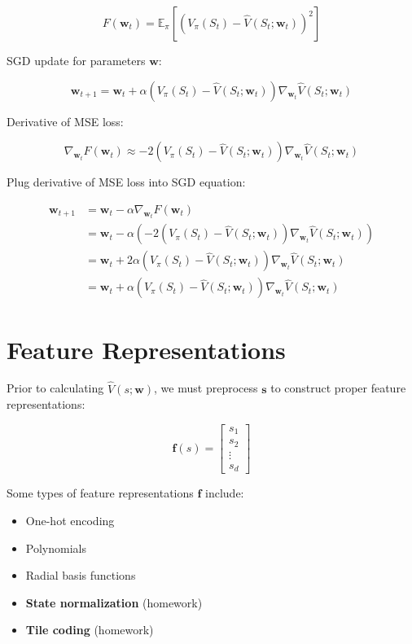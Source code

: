 \documentclass[
  letterpaper,
  DIV=11,
  numbers=noendperiod]{scrreprt}
\providecommand{\tightlist}{%
  \setlength{\itemsep}{0pt}\setlength{\parskip}{0pt}}\usepackage{longtable,booktabs,array}
\begin{document}
\[
F(\mathbf{w}_{t}) = \mathbb{E}_{\pi}[(V_{\pi}(S_{t}) - \hat{V}(S_{t}; \mathbf{w}_{t}))^{2}]
\]

SGD update for parameters \(\mathbf{w}\):

\[
\mathbf{w}_{t+1} = \mathbf{w}_{t} + \alpha(V_{\pi}(S_{t}) - \hat{V}(S_{t}; \mathbf{w}_{t}))\nabla_{\mathbf{w}_{t}} \hat{V}(S_{t}; \mathbf{w}_{t})
\]

Derivative of MSE loss:

\[
\nabla_{\mathbf{w}_{t}} F(\mathbf{w}_{t}) \approx -2(V_{\pi}(S_{t}) - \hat{V}(S_{t}; \mathbf{w}_{t}))\nabla_{\mathbf{w}_{t}} \hat{V}(S_{t}; \mathbf{w}_{t})
\]

Plug derivative of MSE loss into SGD equation:

\[
\begin{align}
\mathbf{w}_{t+1} &= \mathbf{w}_{t} - \alpha \nabla_{\mathbf{w}_{t}} F(\mathbf{w}_{t}) \\[10pt]
 &= \mathbf{w}_{t} - \alpha (-2(V_{\pi}(S_{t}) - \hat{V}(S_{t}; \mathbf{w}_{t}))\nabla_{\mathbf{w}_{t}} \hat{V}(S_{t}; \mathbf{w}_{t})) \\[10pt]
&= \mathbf{w}_{t} + 2\alpha(V_{\pi}(S_{t}) - \hat{V}(S_{t}; \mathbf{w}_{t}))\nabla_{\mathbf{w}_{t}} \hat{V}(S_{t}; \mathbf{w}_{t}) \\[10pt]
 &= \mathbf{w}_{t} + \alpha(V_{\pi}(S_{t}) - \hat{V}(S_{t}; \mathbf{w}_{t}))\nabla_{\mathbf{w}_{t}} \hat{V}(S_{t}; \mathbf{w}_{t})
\end{align}
\]

\section{Feature Representations}\label{feature-representations}

Prior to calculating \(\hat{V}(s; \mathbf{w})\), we must preprocess
\(\mathbf{s}\) to construct proper feature representations:

\[
\mathbf{f}(s) = \begin{bmatrix} s_1 \\ s_2 \\ \vdots \\ s_d \end{bmatrix}
\]

Some types of feature representations \(\mathbf{f}\) include:

\begin{itemize}
\tightlist
\item
  One-hot encoding
\item
  Polynomials
\item
  Radial basis functions
\item
  \textbf{State normalization} (homework)
\item
  \textbf{Tile coding} (homework)
\end{itemize}
\end{document}
